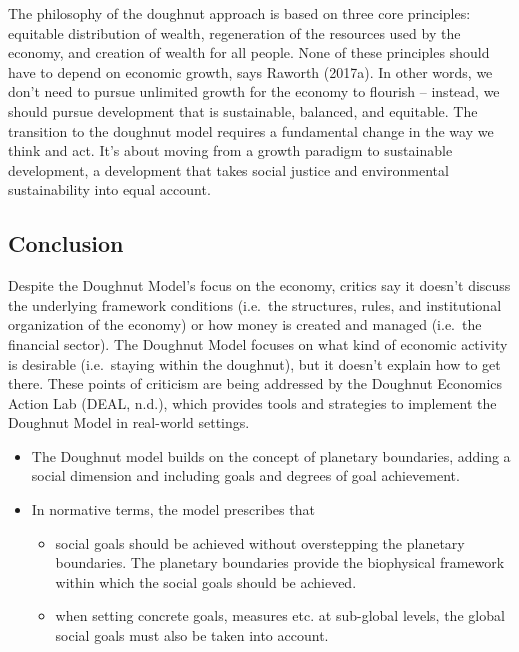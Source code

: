 \documentclass[
  a4paper,
  openany]{book}
\begin{document}
The philosophy of the doughnut approach is based on three core
principles: equitable distribution of wealth, regeneration of the
resources used by the economy, and creation of wealth for all people.
None of these principles should have to depend on economic growth, says
Raworth (2017a). In other words, we don't need to pursue unlimited
growth for the economy to flourish -- instead, we should pursue
development that is sustainable, balanced, and equitable. The transition
to the doughnut model requires a fundamental change in the way we think
and act. It's about moving from a growth paradigm to sustainable
development, a development that takes social justice and environmental
sustainability into equal account.

\subsection{Conclusion}\label{conclusion-1}

Despite the Doughnut Model's focus on the economy, critics say it
doesn't discuss the underlying framework conditions (i.e.~the
structures, rules, and institutional organization of the economy) or how
money is created and managed (i.e.~the financial sector). The Doughnut
Model focuses on what kind of economic activity is desirable
(i.e.~staying within the doughnut), but it doesn't explain how to get
there. These points of criticism are being addressed by the Doughnut
Economics Action Lab (DEAL, n.d.), which provides tools and strategies
to implement the Doughnut Model in real-world settings.

\begin{itemize}
\item
  The Doughnut model builds on the concept of planetary boundaries,
  adding a social dimension and including goals and degrees of goal
  achievement.
\item
  In normative terms, the model prescribes that

  \begin{itemize}
  \item
    social goals should be achieved without overstepping the planetary
    boundaries. The planetary boundaries provide the biophysical
    framework within which the social goals should be achieved.
  \item
    when setting concrete goals, measures etc. at sub-global levels, the
    global social goals must also be taken into account.
  \end{itemize}
\end{itemize}
\end{document}
